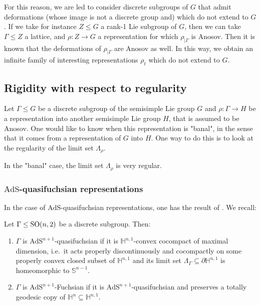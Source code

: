 \documentclass{report}
\begin{document}
For this reason, we are led to consider discrete subgroups of $G$ that admit deformations (whose image is not a discrete group and) which do not extend to $G$.
If we take for instance $Z \leq G$ a rank-1 Lie subgroup of $G$, then we can take $\Gamma \leq Z$ a lattice, and $\rho: Z \to G$ a representation for which $\rho_{|\Gamma}$ is Anosov.
Then it is known that the deformations of $\rho_{|\Gamma}$ are Anosov as well.
In this way, we obtain an infinite family of interesting representations $\rho_t$ which do not extend to $G$.
\subsection{Rigidity with respect to regularity}
Let $\Gamma \leq G$ be a discrete subgroup of the semisimple Lie group $G$ and $\rho: \Gamma \to H$ be a representation into another semisimple Lie group $H$, that is assumed to be Anosov.
One would like to know when this representation is "banal", in the sense that it comes from a representation of $G$ into $H$.
One way to do this is to look at the regularity of the limit set $\Lambda_\rho$.

In the "banal" case, the limit set $\Lambda_\rho$ is very regular.

\subsubsection{$\mathrm{AdS}$-quasifuchsian representations}
In the case of $\mathrm{AdS}$-quasifuchsian representations, one has the result of \cite{glorieux2018regularity}.
We recall:
\begin{definition}
    Let $\Gamma \leq \operatorname{{\mathrm{SO}}}(n,2)$ be a discrete subgroup.
    Then:
    \begin{enumerate}
        \item $\Gamma$ is $\mathrm{AdS}^{n+1}$-quasifuchsian if it is $\mathbb H^{n,1}$-convex cocompact of maximal dimension, i.e.\ it acts properly discontinuously and cocompactly on some properly convex closed subset of $\mathbb H^{n,1}$ and its limit set $\Lambda_\Gamma \subseteq \partial \mathbb H^{n,1}$ is homeomorphic to $\mathbb S^{n-1}$.
        \item $\Gamma$ is $\mathrm{AdS}^{n+1}$-Fuchsian if it is $\mathrm{AdS}^{n+1}$-quasifuchsian and preserves a totally geodesic copy of $\mathbb H^n \subseteq \mathbb H^{n,1}$.
    \end{enumerate}
\end{definition}
\end{document}
